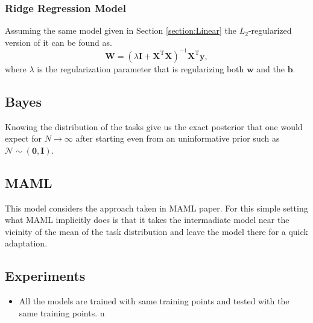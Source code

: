 \subsubsection{Ridge Regression Model}
Assuming the same model given in Section \ref{section:Linear} the $L_2$-regularized version of it can be found as. 
\begin{equation}
  \mathbf{W}=(\lambda\mathbf{I}+\mathbf{X}^{\text{T}}\mathbf{X})^{-1}\mathbf{X}^{\text{T}}\mathbf{y},
\end{equation}
where $\lambda$ is the regularization parameter that is regularizing both $\mathbf{w}$ and the $\mathbf{b}$.

\subsection{Bayes}
Knowing the distribution of the tasks give us the exact posterior that one would expect for $N\to\infty$ after starting even from an uninformative prior such as $\mathcal{N}\sim(\mathbf{0}, \mathbf{I})$.

\subsection{MAML}
This model considers the approach taken in MAML paper. For this simple setting what MAML implicitly does is that it takes the intermadiate model near the vicinity of the mean of the task distribution and leave the model there for a quick adaptation.
\subsection*{Experiments}
\begin{itemize}
  \item All the models are trained with same training points and tested with the same training points.
n\end{itemize}
